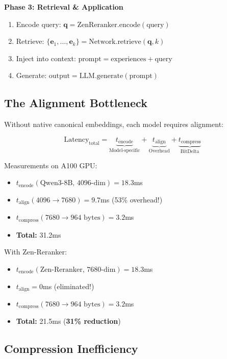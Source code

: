 \documentclass[11pt,a4paper]{article}
\begin{document}
\textbf{Phase 3: Retrieval \& Application}
\begin{enumerate}
\item Encode query: $\mathbf{q} = \text{ZenReranker.encode}(\text{query})$
\item Retrieve: $\{\mathbf{e}_1, \ldots, \mathbf{e}_k\} = \text{Network.retrieve}(\mathbf{q}, k)$
\item Inject into context: $\text{prompt} = \text{experiences} + \text{query}$
\item Generate: $\text{output} = \text{LLM.generate}(\text{prompt})$
\end{enumerate}

\subsection{The Alignment Bottleneck}

Without native canonical embeddings, each model requires alignment:

\begin{equation}
\text{Latency}_{\text{total}} = \underbrace{t_{\text{encode}}}_{\text{Model-specific}} + \underbrace{t_{\text{align}}}_{\text{Overhead}} + \underbrace{t_{\text{compress}}}_{\text{BitDelta}}
\end{equation}

Measurements on A100 GPU:
\begin{itemize}
\item $t_{\text{encode}}(\text{Qwen3-8B, 4096-dim}) = 18.3$ms
\item $t_{\text{align}}(4096 \to 7680) = 9.7$ms (53\% overhead!)
\item $t_{\text{compress}}(7680 \to 964\text{ bytes}) = 3.2$ms
\item \textbf{Total:} 31.2ms
\end{itemize}

With Zen-Reranker:
\begin{itemize}
\item $t_{\text{encode}}(\text{Zen-Reranker, 7680-dim}) = 18.3$ms
\item $t_{\text{align}} = 0$ms (eliminated!)
\item $t_{\text{compress}}(7680 \to 964\text{ bytes}) = 3.2$ms
\item \textbf{Total:} 21.5ms (\textbf{31\% reduction})
\end{itemize}

\subsection{Compression Inefficiency}
\end{document}
